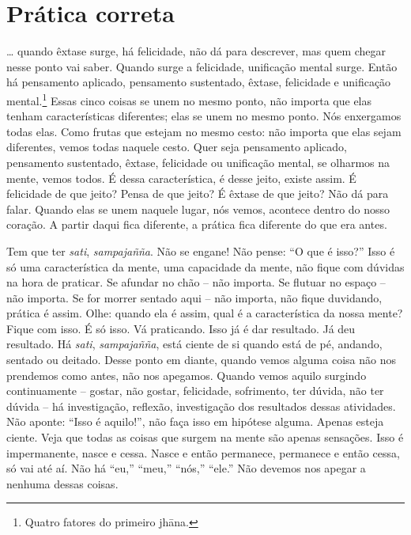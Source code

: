
\chapter{Prática correta}
\markright{\theChapterAuthor}

\ldots{} quando êxtase surge, há felicidade, não dá para descrever, mas
quem chegar nesse ponto vai saber. Quando surge a felicidade,
unificação mental surge. Então há pensamento aplicado, pensamento
sustentado, êxtase, felicidade e unificação mental.\footnote{Quatro
fatores do primeiro jhāna.} Essas cinco coisas se unem no mesmo
ponto, não importa que elas tenham características diferentes; elas se
unem no mesmo ponto. Nós enxergamos todas elas. Como frutas que estejam
no mesmo cesto: não importa que elas sejam diferentes, vemos todas
naquele cesto. Quer seja pensamento aplicado, pensamento sustentado,
êxtase, felicidade ou unificação mental, se olharmos na mente, vemos
todos. É dessa característica, é desse jeito, existe assim. É
felicidade de que jeito? Pensa de que jeito? É êxtase de que jeito? Não
dá para falar. Quando elas se unem naquele lugar, nós vemos, acontece
dentro do nosso coração. A partir daqui fica diferente, a prática fica
diferente do que era antes.

Tem que ter \emph{sati}, \emph{sampajañña}. Não se engane! Não
pense: “O que é isso?” Isso é só uma característica da mente, uma
capacidade da mente, não fique com dúvidas na hora de praticar. Se
afundar no chão – não importa. Se flutuar no espaço – não importa. Se
for morrer sentado aqui – não importa, não fique duvidando, prática é
assim. Olhe: quando ela é assim, qual é a característica da nossa
mente? Fique com isso. É só isso. Vá praticando. Isso já é dar
resultado. Já deu resultado. Há \emph{sati}, \emph{sampajañña},
está ciente de si quando está de pé, andando, sentado ou deitado. Desse
ponto em diante, quando vemos alguma coisa não nos prendemos como
antes, não nos apegamos. Quando vemos aquilo surgindo continuamente –
gostar, não gostar, felicidade, sofrimento, ter dúvida, não ter dúvida
– há investigação, reflexão, investigação dos resultados dessas
atividades. Não aponte: “Isso é aquilo!”, não faça isso em hipótese
alguma. Apenas esteja ciente. Veja que todas as coisas que surgem na
mente são apenas sensações. Isso é impermanente, nasce e cessa. Nasce e
então permanece, permanece e então cessa, só vai até aí. Não há “eu,”
“meu,” “nós,” “ele.” Não devemos nos apegar a nenhuma dessas coisas. 

